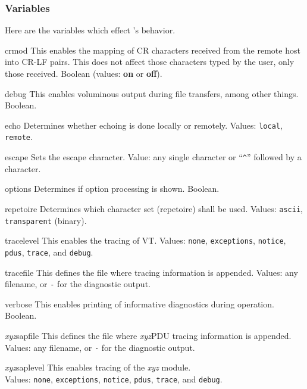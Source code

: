 \subsubsection	{Variables}
Here are the variables which effect 's behavior.
\begin{describe}
\item[crmod]
This enables the mapping of CR characters received from the
remote host into CR-LF pairs.
This does not affect those characters typed by the user,
only those received.
Boolean (values: {\bf on\/} or {\bf off\/}).

\item[debug]
This enables voluminous output during file transfers,
among other things.  Boolean.

\item[echo]
Determines whether echoing is done locally or remotely.
Values: \verb"local", \verb"remote".

\item[escape]
Sets the escape character.
Value: any single character or ``\verb"^"'' followed by a character.

\item[options]
Determines if option processing is shown.
Boolean.

\item[repetoire]
Determines which character set (repetoire) shall be used.
Values: \verb"ascii", \verb"transparent" (binary).

\item[tracelevel]
This enables the tracing of VT.
Values: \verb"none", \verb"exceptions", \verb"notice", \verb"pdus",
\verb"trace", and \verb"debug".

\item[tracefile]
This defines the file where tracing information is appended.
Values: any filename, or \verb"-" for the diagnostic output.

\item[verbose]
This enables printing of informative diagnostics during operation.  Boolean.

\item[{\em xyz\/}sapfile]
This defines the file where {\em xyz\/}PDU tracing information is appended.
Values: any filename, or \verb"-" for the diagnostic output.

\item[{\em xyz\/}saplevel]
This enables tracing of the {\em xyz\/} module.\\
Values: \verb"none", \verb"exceptions", \verb"notice", \verb"pdus",
\verb"trace", and \verb"debug".
\end{describe}

